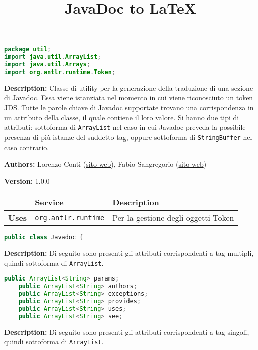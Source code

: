 \documentclass{article}
\title{JavaDoc to LaTeX}
\begin{document}
\begin{lstlisting}[language=Java]
package util;
import java.util.ArrayList;
import java.util.Arrays;
import org.antlr.runtime.Token;
\end{lstlisting}
\vspace{0.5cm}
\textbf{Description:}  Classe di utility per la generazione della traduzione di una sezione di Javadoc.  Essa viene istanziata nel momento in cui viene riconosciuto un token JDS. Tutte le parole chiave di Javadoc supportate trovano una corrispondenza in un attributo della classe, il quale contiene il loro valore. Si hanno due tipi di attributi: sottoforma di \texttt{ArrayList} nel caso in cui Javadoc preveda la possibile presenza di più istanze del suddetto tag, oppure sottoforma di \texttt{StringBuffer} nel caso contrario.  

\textbf{Authors:} Lorenzo Conti        (\href{https://www.lorenzoconti.dev}{sito web}), Fabio Sangregorio    (\href{https://fabio.sangregorio.dev}{sito web})

\textbf{Version:} 1.0.0

\begin{table}[!h]\centering
\begin{tabular}{|l|p{}|p{}|}
\hline & \textbf{Service} & \textbf{Description} \\ \hline
\multirow{1}{*}{\textbf{Uses}}
& \texttt{org.antlr.runtime} & Per la gestione degli oggetti Token \\
\hline
\end{tabular}\end{table}
\begin{lstlisting}[language=Java]
public class Javadoc {
\end{lstlisting}
\vspace{0.5cm}
\textbf{Description:}  Di seguito sono presenti gli attributi corrispondenti a tag multipli, quindi sottoforma di \texttt{ArrayList}.

\begin{lstlisting}[language=Java]
    public ArrayList<String> params;
    public ArrayList<String> authors;
    public ArrayList<String> exceptions;
    public ArrayList<String> provides;
    public ArrayList<String> uses;
    public ArrayList<String> see;
\end{lstlisting}
\vspace{0.5cm}
\textbf{Description:}  Di seguito sono presenti gli attributi corrispondenti a tag singoli, quindi sottoforma di \texttt{ArrayList}.
\end{document}

